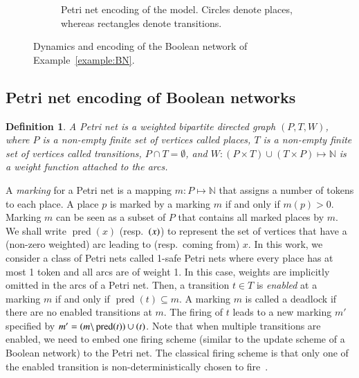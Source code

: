 \documentclass[preprint,12pt]{elsarticle}
\newtheorem{definition}{Definition}[section]
\DeclareMathOperator{\pred}{pred}
\let\succ\relax
\DeclareMathOperator{\succ}{succ}
\begin{document}
\begin{figure}[!htb]
\begin{subfigure}[b]{0.6\textwidth}
\caption{Petri net encoding of the model. Circles denote places, whereas rectangles denote transitions.}%
\label{fig:PN}
\end{subfigure}%
\caption{Dynamics and encoding of the Boolean network of Example~\ref{example:BN}.}%
\label{fig:stg_and_PN}
\end{figure}

\subsection{Petri net encoding of Boolean networks}%
\label{sec:encoding}

\begin{definition}

  A \emph{Petri net} is a weighted bipartite directed graph \((P, T, W)\),
  where \(P\) is a non-empty finite set of vertices called \emph{places},
  \(T\) is a non-empty finite set of vertices called \emph{transitions},
  \(P \cap T = \emptyset\),
  and \(W : (P \times T) \cup (T \times P) \mapsto \mathbb{N} \) is a weight function attached to the arcs.

\end{definition}
A \emph{marking} for a Petri net is a mapping \(m : P \mapsto \mathbb{N}\) that assigns a number of tokens to each place.
A place \(p\) is marked by a marking \(m\) if and only if \(m(p) > 0\).
Marking \(m\) can be seen as a subset of \(P\) that contains all marked places by \(m\).
We shall write \(\pred(x)\) (resp.\ \(\succ(x)\)) to represent the set of vertices that have a (non-zero weighted) arc leading to (resp.\ coming from) \(x\).
In this work, we consider a class of Petri nets called 1-safe Petri nets where every place has at most 1 token and all arcs are of weight 1.
In this case, weights are implicitly omitted in the arcs of a Petri net.
Then, a transition \(t \in T\) is \emph{enabled} at a marking \(m\) if and only if \(\pred(t) \subseteq m\).
A marking \(m\) is called a deadlock if there are no enabled transitions at \(m\).
The firing of \(t\) leads to a new marking \(m'\) specified by \(m' = (m \backslash \pred(t)) \cup \succ(t)\).
Note that when multiple transitions are enabled, we need to embed one firing scheme (similar to the update scheme of a Boolean network) to the Petri net.
The classical firing scheme is that only one of the enabled transition is non-deterministically chosen to fire~\cite{Murata1989}.
\end{document}
